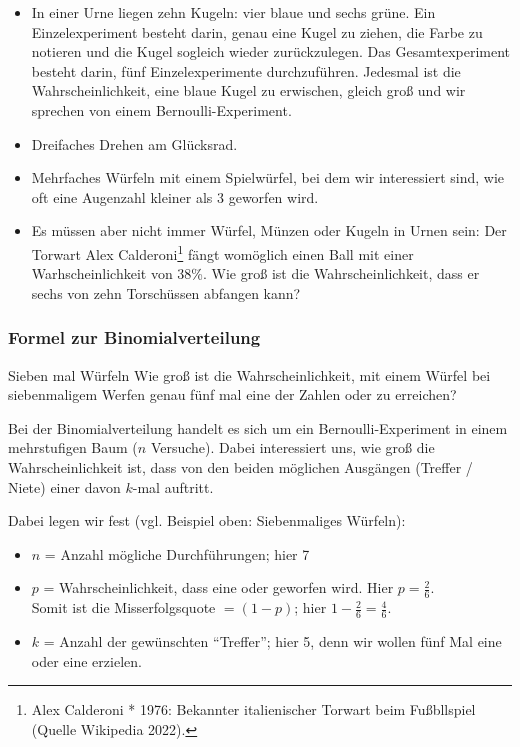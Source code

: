 \begin{itemize}
\item
In einer Urne liegen zehn Kugeln: vier blaue und sechs grüne. Ein
Einzelexperiment besteht darin, genau eine Kugel zu ziehen, die Farbe
zu notieren und die Kugel sogleich wieder zurückzulegen.
Das Gesamtexperiment besteht darin, fünf Einzelexperimente
durchzuführen. Jedesmal ist die Wahrscheinlichkeit, eine blaue Kugel
zu erwischen, gleich groß und wir sprechen von einem Bernoulli-Experiment.

\item Dreifaches Drehen am Glücksrad.

\item Mehrfaches Würfeln mit einem Spielwürfel, bei dem wir
  interessiert sind, wie oft eine Augenzahl kleiner als 3 geworfen wird.
  
\item
Es müssen aber nicht immer Würfel, Münzen oder Kugeln in Urnen sein:
Der Torwart Alex Calderoni\footnote{Alex Calderoni * 1976: Bekannter
  italienischer Torwart beim Fußbllspiel (Quelle Wikipedia 2022).}
fängt womöglich einen Ball mit einer
Warhscheinlichkeit von 38\%.
Wie groß ist die Wahrscheinlichkeit, dass er sechs von zehn Torschüssen
abfangen kann?
\end{itemize}
\newpage


\subsubsection{Formel zur Binomialverteilung}


\begin{beispiel}{Sieben mal Würfeln}{}
Wie groß ist die Wahrscheinlichkeit, mit einem Würfel bei
siebenmaligem Werfen genau fünf mal eine der Zahlen  oder
 zu erreichen?
\end{beispiel}

Bei der Binomialverteilung handelt es sich um ein
Bernoulli-Experiment
in einem mehrstufigen Baum ($n$ Versuche). Dabei interessiert
uns, wie groß die Wahrscheinlichkeit ist, dass von den beiden
möglichen Ausgängen (Treffer / Niete) einer davon $k$-mal auftritt.

Dabei legen wir fest (vgl. Beispiel oben: Siebenmaliges Würfeln):
\begin{itemize}

\item
  $n$ = Anzahl mögliche Durchführungen; hier 7

\item
  $p$ = Wahrscheinlichkeit, dass eine  oder 
  geworfen wird. Hier $p = \frac26$.\\
  Somit ist die Misserfolgsquote $= (1-p)$; hier $1-\frac26=\frac46$.


\item
  $k$ = Anzahl der gewünschten ``Treffer''; hier 5, denn wir wollen fünf
Mal eine  oder eine  erzielen.
\end{itemize}

